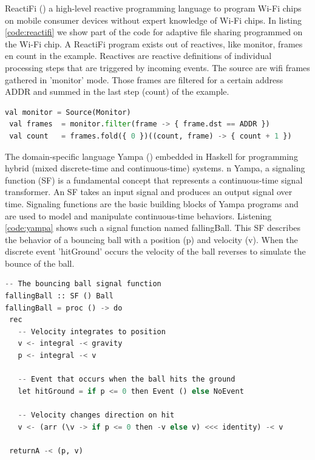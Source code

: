\documentclass[a4paper]{book}
\begin{document}
ReactiFi (\cite{DBLP:journals/programming/SterzEMBGHMF21}) a high-level reactive programming language to program Wi-Fi chips on mobile consumer devices without expert knowledge of Wi-Fi chips. In listing \ref{code:reactifi} we show part of the code for adaptive file sharing programmed on the Wi-Fi chip. A ReactiFi program exists out of reactives, like monitor, frames en count in the example. Reactives are reactive definitions of individual processing steps that are triggered by incoming events. The source are wifi frames gathered in 'monitor' mode. Those frames are filtered for a certain address ADDR and summed in the last step (count) of the example.

\begin{lstlisting}[language=Python, caption={ReactiFi, Wi-Fi file sharing (\cite{DBLP:journals/programming/SterzEMBGHMF21})},captionpos=b, label={code:reactifi}, basicstyle=\small\ttfamily, frame=single]
 val monitor = Source(Monitor)
 val frames  = monitor.filter(frame -> { frame.dst == ADDR })
 val count   = frames.fold({ 0 })((count, frame) -> { count + 1 })
\end{lstlisting}

The domain-specific language Yampa (\cite{DBLP:conf/haskell/CourtneyNP03}) embedded in Haskell for programming hybrid (mixed discrete-time and continuous-time) systems. n Yampa, a signaling function (SF) is a fundamental concept that represents a continuous-time signal transformer. An SF takes an input signal and produces an output signal over time. Signaling functions are the basic building blocks of Yampa programs and are used to model and manipulate continuous-time behaviors. Listening \ref{code:yampa} shows such a signal function named fallingBall. This SF describes the behavior of a bouncing ball with a position (p) and velocity (v). When the discrete event 'hitGround' occurs the velocity of the ball reverses to simulate the bounce of the ball.
\begin{lstlisting}[language=Python, caption={Yampa, bouncing ball (\cite{YampaBook})},captionpos=b, label={code:yampa}, basicstyle=\small\ttfamily, frame=single]
-- The bouncing ball signal function
fallingBall :: SF () Ball
fallingBall = proc () -> do
 rec
   -- Velocity integrates to position
   v <- integral -< gravity
   p <- integral -< v

   -- Event that occurs when the ball hits the ground
   let hitGround = if p <= 0 then Event () else NoEvent
	
   -- Velocity changes direction on hit
   v <- (arr (\v -> if p <= 0 then -v else v) <<< identity) -< v

 returnA -< (p, v)
\end{lstlisting}
\end{document}
